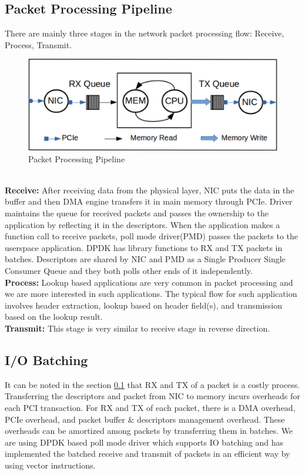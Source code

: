 \subsection{Packet Processing Pipeline}
\label{overview}
There are mainly three stages in the network packet processing flow: Receive, Process, Transmit.
\begin{figure}[ht]
\includegraphics[width = \linewidth]{Figures/queuing.png}
\caption{Packet Processing Pipeline}
\label{overviewfigure}
\end{figure}
\\
\textbf{Receive:} After receiving data from the physical layer, NIC puts the data in the buffer and then DMA engine transfers it in main memory through PCIe. Driver maintains the queue for received packets and passes the ownership to the application by reflecting it in the descriptors. When the application makes a function call to receive packets, poll mode driver(PMD) passes the packets to the userspace application. DPDK has library functions to RX and TX packets in batches. Descriptors are shared by NIC and PMD as a Single  Producer Single Consumer Queue and they both polls other ends of it independently.
\\
\textbf{Process:} Lookup based applications are very common in packet processing and we are more interested in such applications. The typical flow for such application involves header extraction, lookup based on header field(s), and transmission based on the lookup result.
\\
\textbf{Transmit:} This stage is very similar to receive stage in reverse direction.

\subsection{I/O Batching}
\label{iobatching}
It can be noted in the section \ref{overview} that RX and TX of a packet is a costly process. Transferring the descriptors and packet from NIC to memory incurs overheads for each PCI transaction. For RX and TX of each packet, there is a DMA overhead, PCIe overhead, and packet buffer \& descriptors management overhead. These overheads can be amortized among packets by transferring them in batches. We are using DPDK based poll mode driver which supports IO batching and has implemented the batched receive and transmit of packets in an efficient way by using vector instructions.


